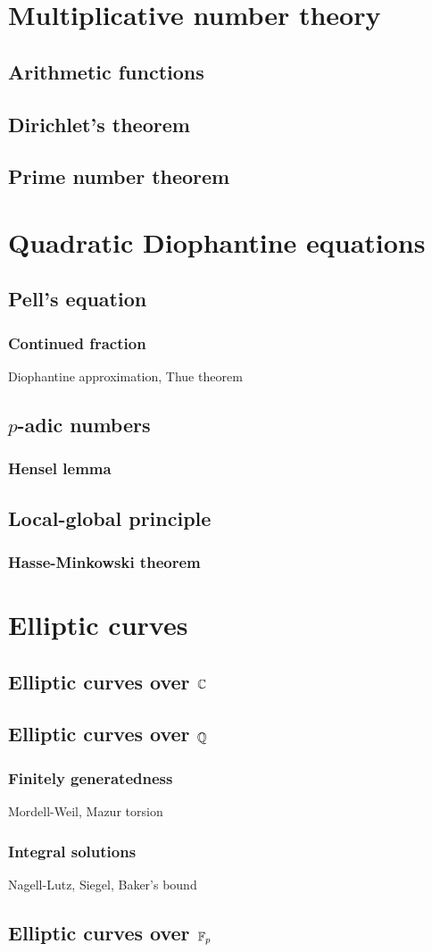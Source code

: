 \documentclass{../note}
\begin{document}
\part{Multiplicative number theory}
\chapter{Arithmetic functions}
\chapter{Dirichlet's theorem}
\chapter{Prime number theorem}




\part{Quadratic Diophantine equations}
\chapter{Pell's equation}
\section{Continued fraction}
Diophantine approximation, Thue theorem
\chapter{$p$-adic numbers}
\section{Hensel lemma}
\chapter{Local-global principle}
\section{Hasse-Minkowski theorem}




\part{Elliptic curves}
\chapter{Elliptic curves over $\mathbb{C}$}
\chapter{Elliptic curves over $\mathbb{Q}$}
\section{Finitely generatedness}
Mordell-Weil, Mazur torsion
\section{Integral solutions}
Nagell-Lutz, Siegel, Baker's bound
\chapter{Elliptic curves over $\mathbb{F}_p$}
\end{document}
